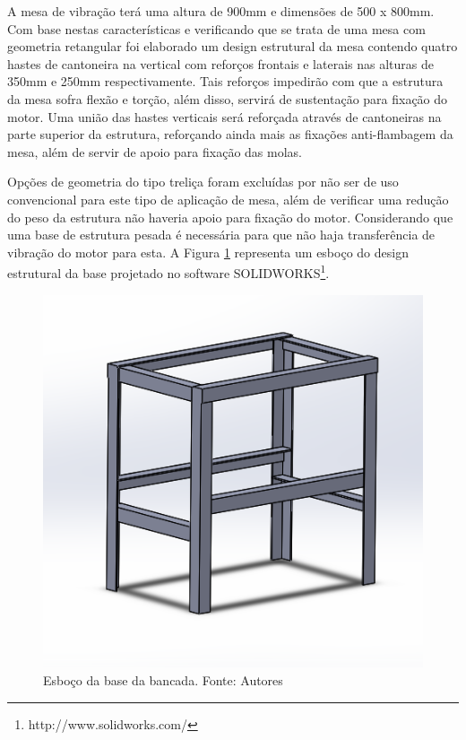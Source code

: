   A mesa de vibração terá uma altura de 900mm e dimensões de 500 x 800mm. Com base nestas características e verificando que se trata de 
  uma mesa com geometria retangular foi elaborado um design estrutural da mesa contendo quatro hastes de cantoneira na vertical com reforços
  frontais e laterais nas alturas de 350mm e 250mm respectivamente. Tais reforços impedirão com que a estrutura da mesa sofra flexão e torção, 
  além disso, servirá de sustentação para fixação do motor. Uma união das hastes verticais será reforçada através de cantoneiras na parte superior
  da estrutura, reforçando ainda mais as fixações anti-flambagem da mesa, além de servir de apoio para fixação das molas.

    Opções de geometria do tipo treliça foram excluídas por não ser de uso convencional para este tipo de aplicação de mesa, além de verificar 
    uma redução do peso da estrutura não haveria apoio para fixação do motor. Considerando que uma base de estrutura pesada é necessária para 
    que não haja transferência de vibração do motor para esta. A Figura \ref{fig:base_bancada} representa um esboço do design estrutural da base 
    projetado no software SOLIDWORKS\footnote{http://www.solidworks.com/}.

\begin{figure}[!ht]
\centering
\includegraphics[scale=0.5]{figuras/base_bancada.png}
\caption{Esboço da base da bancada. Fonte: Autores}
\label{fig:base_bancada}
\end{figure}

